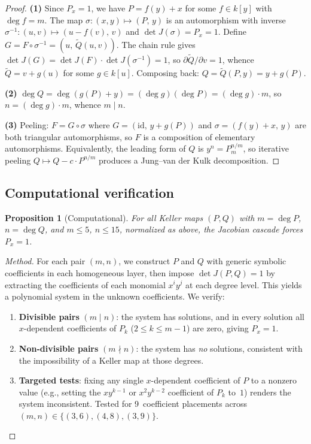 \documentclass[12pt,a4paper]{article}
\newtheorem{proposition}[theorem]{Proposition}
\theoremstyle{definition}
\newcommand{\kk}{k}
\begin{document}
\begin{proof}
\textbf{(1)} Since $P_x = 1$, we have $P = f(y) + x$ for some $f \in \kk[y]$
with $\deg f = m$. The map $\sigma \colon (x,y) \mapsto (P,\, y)$ is an
automorphism with inverse $\sigma^{-1} \colon (u,v) \mapsto (u - f(v),\, v)$
and $\det J(\sigma) = P_x = 1$. Define $G = F \circ \sigma^{-1} = (u,\, \tilde{Q}(u,v))$.
The chain rule gives $\det J(G) = \det J(F) \cdot \det J(\sigma^{-1}) = 1$, so
$\partial \tilde{Q}/\partial v = 1$, whence $\tilde{Q} = v + g(u)$ for some
$g \in \kk[u]$. Composing back: $Q = \tilde{Q}(P, y) = y + g(P)$.

\textbf{(2)} $\deg Q = \deg(g(P) + y) = (\deg g)(\deg P) = (\deg g) \cdot m$,
so $n = (\deg g) \cdot m$, whence $m \mid n$.

\textbf{(3)} Peeling: $F = G \circ \sigma$ where $G = (\mathrm{id},\, y + g(P))$
and $\sigma = (f(y) + x,\, y)$ are both triangular automorphisms, so $F$ is
a composition of elementary automorphisms. Equivalently, the leading form of $Q$
is $y^n = P_m^{n/m}$, so iterative peeling $Q \mapsto Q - c \cdot P^{n/m}$
produces a Jung--van der Kulk decomposition.
\end{proof}

\subsection{Computational verification}

\begin{proposition}[Computational]\label{prop:px-comp}
For all Keller maps $(P,Q)$ with $m = \deg P$, $n = \deg Q$, and $m \leq 5$,
$n \leq 15$, normalized as above, the Jacobian cascade forces $P_x = 1$.
\end{proposition}

\begin{proof}[Method]
For each pair $(m,n)$, we construct $P$ and $Q$ with generic symbolic coefficients
in each homogeneous layer, then impose $\det J(P,Q) = 1$ by extracting the
coefficients of each monomial $x^i y^j$ at each degree level. This yields a
polynomial system in the unknown coefficients. We verify:

\begin{enumerate}
\item \textbf{Divisible pairs} $(m \mid n)$: the system has solutions, and in every
  solution all $x$-dependent coefficients of $P_k$ ($2 \leq k \leq m-1$) are zero,
  giving $P_x = 1$.
\item \textbf{Non-divisible pairs} $(m \nmid n)$: the system has \emph{no} solutions,
  consistent with the impossibility of a Keller map at those degrees.
\item \textbf{Targeted tests}: fixing any single $x$-dependent coefficient of $P$
  to a nonzero value (e.g., setting the $xy^{k-1}$ or $x^2 y^{k-2}$ coefficient
  of $P_k$ to~$1$) renders the system inconsistent. Tested for 9~coefficient
  placements across $(m,n) \in \{(3,6), (4,8), (3,9)\}$.
\end{enumerate}
\end{proof}
\end{document}
